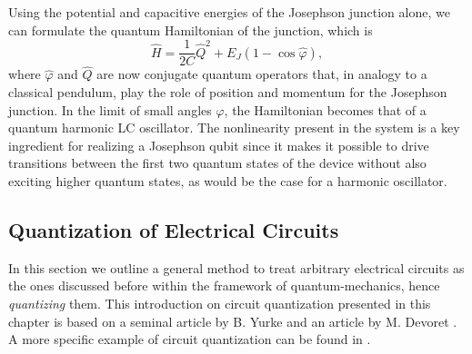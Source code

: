 \smallskip

Using the potential and capacitive energies of the Josephson junction alone, we can formulate the quantum Hamiltonian of the junction, which is
%
\begin{equation}
\hat{H} = \frac{1}{2C}\hat{Q}^2+E_J(1-\cos{\hat{\varphi}}),
\end{equation}
%
where $\hat{\varphi}$ and $\hat{Q}$ are now conjugate quantum operators that, in analogy to a classical pendulum, play the role of position and momentum for the Josephson junction. In the limit of small angles $\varphi$, the Hamiltonian becomes that of a quantum harmonic LC oscillator. The nonlinearity present in the system is a key ingredient for realizing a Josephson qubit since it makes it possible to drive transitions between the first two quantum states of the device without also exciting higher quantum states, as would be the case for a harmonic oscillator.

\subsection{Quantization of Electrical Circuits}

In this section we outline a general method to treat arbitrary electrical circuits as the ones discussed before within the framework of quantum-mechanics, hence {\it quantizing} them. This introduction on circuit quantization presented in this chapter is based on a seminal article by B. Yurke \citep{yurke_quantum_1984} and an article by M. Devoret \cite{devoret_quantum_1995}. A more specific example of circuit quantization can be found in \citep{burkard_multilevel_2004}.

\smallskip

